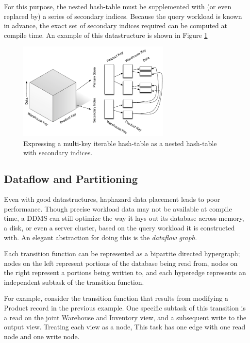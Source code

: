 For this purpose, the nested hash-table must be supplemented with (or even replaced by) a series of secondary indices.  Because the query workload is known in advance, the exact set of secondary indices required can be computed at compile time.  An example of this datastructure is shown in Figure \ref{fig:diag:nestedHash}

\begin{figure}
\includegraphics[width=3in]{graphics/MultikeyMap}
\caption{Expressing a multi-key iterable hash-table as a nested hash-table with secondary indices.}
\label{fig:diag:nestedHash}
\end{figure}


\subsection{Dataflow and Partitioning}
Even with good datastructures, haphazard data placement leads to poor performance.  Though precise workload data may not be available at compile time, a DDMS can still optimize the way it lays out its database across memory, a disk, or even a server cluster, based on the query workload it is constructed with.  An elegant abstraction for doing this is the \textit{dataflow graph}.

Each transition function can be represented as a bipartite directed hypergraph; nodes on the left represent portions of the database being read from, nodes on the right represent a portions being written to, and each hyperedge represents an independent subtask of the transition function.

For example, consider the transition function that results from modifying a Product record in the previous example.  One specific subtask of this transition is a read on the joint Warehouse and Inventory view, and a subsequent write to the output view.  Treating each view as a node, This task has one edge with one read node and one write node.  

